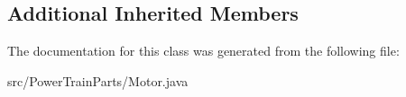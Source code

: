 \subsection*{Additional Inherited Members}


The documentation for this class was generated from the following file\+:\begin{DoxyCompactItemize}
\item 
src/\+Power\+Train\+Parts/Motor.\+java\end{DoxyCompactItemize}
